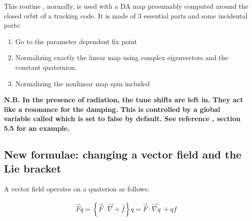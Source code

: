 \documentclass{hitec}     %
\begin{document}
{{{{{{This routine  , normally, is used with a DA map presumably computed around the closed orbit of a tracking code.  It is made of 3 essential parts and some incidental parts:

\begin{enumerate}
\item Go to the parameter dependent fix point 
\item Normalizing exactly the linear map using complex eigenvectors  and the constant quaternion.
\item Normalizing the nonlinear map spin included
\end{enumerate}

{\bf N.B. In the presence of radiation, the tune shifts are left in. They act like a resonance for the damping. This is controlled by a global variable called  which is set to false by default. See reference \cite{thenewbook}, section 5.5 for an example.}


\subsection{New formulae: changing a vector field and the  Lie bracket}\label{s:liebrav}

A vector field operates on a quaterion as follows:

%
\begin{align} \widehat{F}q=
\left\{{\vec{F}\cdot \vec{\nabla }+\widehat{f}}\right\}q=
\vec{F}\cdot \vec{\nabla }q\ +qf  \label{hopq0}\end{align}


}}}}}}
\end{document}
